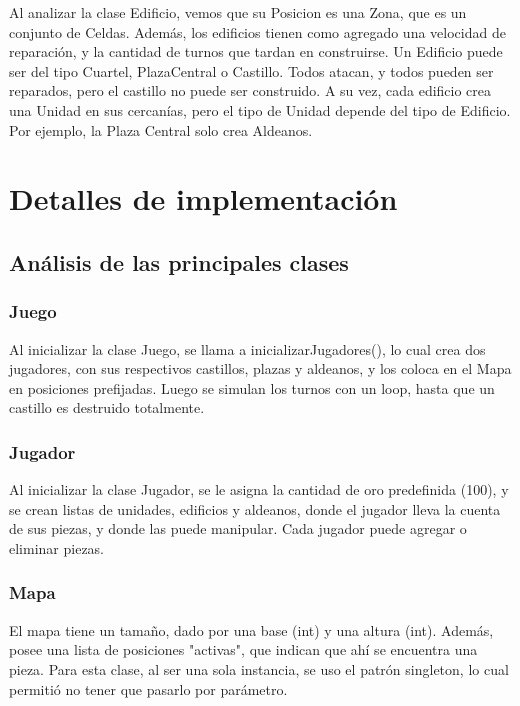 \documentclass[titlepage,a4paper]{article}
\begin{document}
Al analizar la clase Edificio, vemos que su Posicion es una Zona, que es un conjunto de Celdas. Además, los edificios tienen como agregado una velocidad de reparación, y la cantidad de turnos que tardan en construirse. Un Edificio puede ser del tipo Cuartel, PlazaCentral o Castillo. Todos atacan, y todos pueden ser reparados, pero el castillo no puede ser construido.
A su vez, cada edificio crea una Unidad en sus cercanías, pero el tipo de Unidad depende del tipo de Edificio. Por ejemplo, la Plaza Central solo crea Aldeanos. 

\section{Detalles de implementación}\label{sec:implementacion}

\subsection{Análisis de las principales clases}\bigbreak
\subsubsection{Juego}

Al inicializar la clase Juego, se llama a inicializarJugadores(), lo cual crea dos jugadores, con sus respectivos castillos, plazas y aldeanos, y los coloca en el Mapa en posiciones prefijadas. Luego se simulan los turnos con un loop, hasta que un castillo es destruido totalmente.  

\subsubsection{Jugador}

Al inicializar la clase Jugador, se le asigna la cantidad de oro predefinida (100), y se crean listas de unidades, edificios y aldeanos, donde el jugador lleva la cuenta de sus piezas, y donde las puede manipular. Cada jugador puede agregar o eliminar piezas.

\subsubsection{Mapa}

El mapa tiene un tamaño, dado por una base (int) y una altura (int). Además, posee una lista de posiciones "activas", que indican que ahí se encuentra una pieza. Para esta clase, al ser una sola instancia, se uso el patrón singleton, lo cual permitió no tener que pasarlo por parámetro.
\end{document}
